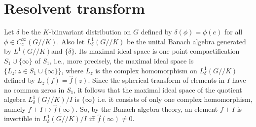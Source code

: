 \documentclass[11pt,reqno]{amsart}
\theoremstyle{definition}
\theoremstyle{definition}
\numberwithin{equation}{section}
\begin{document}
\section{Resolvent transform}
Let $\delta$ be the $K$-biinvariant distribution on $G$ defined by $\delta(\phi)=\phi(e)$ for all $\phi\in C_c^\infty(G//K)$. Also let $L^1_\delta(G//K)$ be the unital Banach algebra generated by $L^1(G//K)$and $\{\delta\}$. Its maximal ideal space is one point compactification $ S_1\cup\{\infty\}$ of $ S_1$, i.e., more precisely, the maximal ideal space is $\big\{L_z:z\in S_1\cup\{\infty\}\big\}$, where $L_z$ is the complex homomorphism on $L^1_\delta(G//K)$ defined by $L_z(f)=\widehat{f}(z)$. Since the spherical transform of elements in $I$ have no common zeros in $ S_1$, it follows that the maximal ideal space of the quotient algebra $L^1_\delta(G//K)/I$ is $\{\infty\}$ i.e. it consists of only one complex homomorphism, namely $f+I\mapsto\widehat{f}(\infty)$. So, by the Banach algebra theory, an element $f+I$ is invertible in $L^1_\delta(G//K)/I$ iff $\widehat{f}(\infty)\neq 0$.
\end{document}
